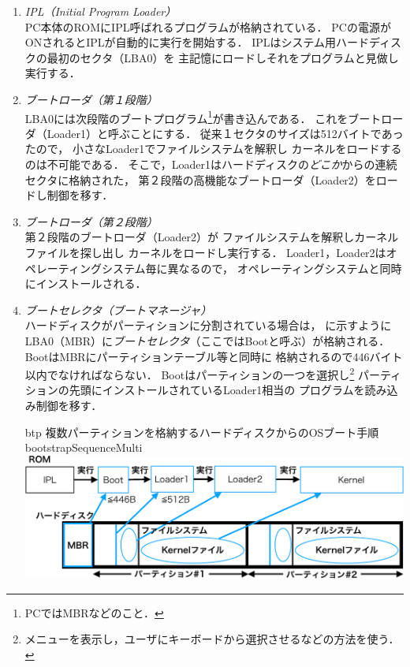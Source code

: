 \begin{enumerate}
\item \emph{IPL（Initial Program Loader）} \\
  PC本体のROMにIPL呼ばれるプログラムが格納されている．
  PCの電源がONされるとIPLが自動的に実行を開始する．
  IPLはシステム用ハードディスクの最初のセクタ（LBA0）を
  主記憶にロードしそれをプログラムと見做し実行する．
\item \emph{ブートローダ（第１段階）} \\
  LBA0には次段階のブートプログラム\footnote{
    PCではMBRなどのこと．}が書き込んである．
  これをブートローダ（Loader1）と呼ぶことにする．
  従来１セクタのサイズは512バイトであったので，
  小さなLoader1でファイルシステムを解釈し
  カーネルをロードするのは不可能である．
  そこで，Loader1はハードディスクの\emph{どこか}からの連続セクタに格納された，
  第２段階の高機能なブートローダ（Loader2）をロードし制御を移す．
\item \emph{ブートローダ（第２段階）} \\
  第２段階のブートローダ（Loader2）が
  ファイルシステムを解釈しカーネルファイルを探し出し
  カーネルをロードし実行する．
  Loader1，Loader2はオペレーティングシステム毎に異なるので，
  オペレーティングシステムと同時にインストールされる．
\item  \emph{ブートセレクタ（ブートマネージャ）} \\
  ハードディスクがパーティションに分割されている場合は，
  に示すように
  LBA0（MBR）に\emph{ブートセレクタ}（ここではBootと呼ぶ）が格納される．
  BootはMBRにパーティションテーブル等と同時に
  格納されるので446バイト以内でなければならない．
  Bootはパーティションの一つを選択し\footnote{
    メニューを表示し，ユーザにキーボードから選択させるなどの方法を使う．}
  パーティションの先頭にインストールされているLoader1相当の
  プログラムを読み込み制御を移す．
  \begin{myfig}{btp}
    {複数パーティションを格納するハードディスクからのOSブート手順}
    {bootstrapSequenceMulti}
    \includegraphics[scale=0.66]{Fig/bootstrapSequenceMulti-crop.pdf}
  \end{myfig}
\end{enumerate}

